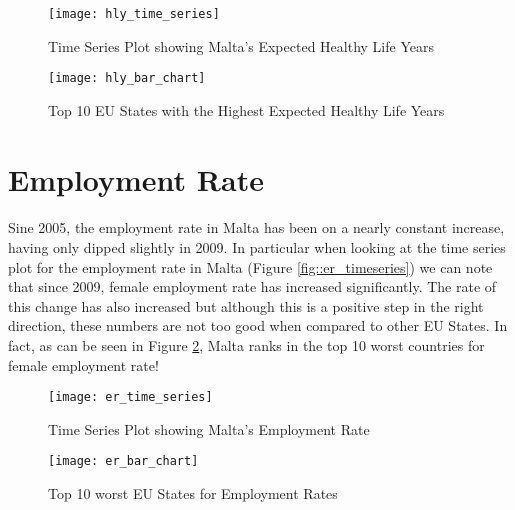 \begin{figure}[!t]
	\begin{minipage}[b]{0.45\linewidth}
		\centering
		\texttt{[image: hly\_time\_series]}
		\caption[Healthy Life Years in Malta]{Time Series Plot showing Malta's Expected Healthy Life Years}
		\label{fig::hly_timeseries}
	\end{minipage}	
	\hspace{0.5cm}
	\begin{minipage}[b]{0.45\linewidth}
		\centering
		\texttt{[image: hly\_bar\_chart]}
		\caption[Top Healthy Life Years in the EU]{Top 10 EU States with the Highest Expected Healthy Life Years}
		\label{fig::hly_bar}
	\end{minipage}	
\end{figure}  

\section{Employment Rate}
\paragraph{ }Sine 2005, the employment rate in Malta has been on a nearly constant increase, having only dipped slightly in 2009. In particular when looking at the time series plot for the employment rate in Malta (Figure \ref{fig::er_timeseries}) we can note that since 2009, female employment rate has increased significantly. The rate of this change has also increased but although this is a positive step in the right direction, these numbers are not too good when compared to other EU States. In fact, as can be seen in Figure \ref{fig::er_bar}, Malta ranks in the top 10 worst countries for female employment rate!

 \begin{figure}[!b]
 	\begin{minipage}[b]{0.45\linewidth}
 		\centering
 		\texttt{[image: er\_time\_series]}
 		\caption[Employment Rate in Malta]{Time Series Plot showing Malta's Employment Rate}
 		\label{fig::er_timeseries}
 	\end{minipage}	
 	\hspace{0.5cm}
 	\begin{minipage}[b]{0.45\linewidth}
 		\centering
 		\texttt{[image: er\_bar\_chart]}
 		\caption[Worst Employment Rate Values in the EU]{Top 10 worst EU States for Employment Rates}
 		\label{fig::er_bar}
 	\end{minipage}	
 \end{figure}  

